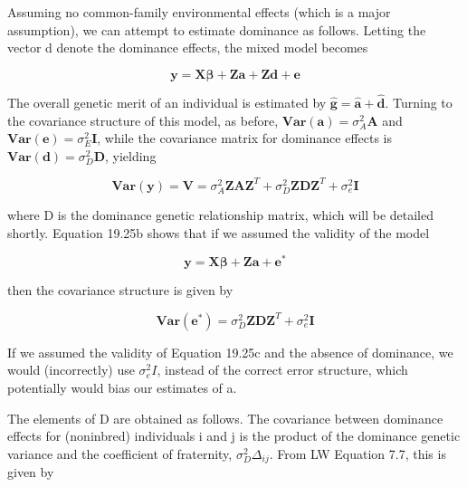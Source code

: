 \documentclass{article}
\begin{document}
Assuming no common-family environmental effects (which is a major assumption), we can attempt to estimate dominance as follows. Letting the vector d denote the dominance effects, the mixed model becomes

\begin{equation}
\mathbf{y}=\mathbf{X}\boldsymbol{\beta}+\mathbf{Z}\mathbf{a}+\mathbf{Z}\mathbf{d}+\mathbf{e}
\tag{19.25a}
\label{eq:19_25a}
\end{equation}

The overall genetic merit of an individual is estimated by  $ \hat{\mathbf{g}} = \hat{\mathbf{a}} + \hat{\mathbf{d}} $. Turning to the covariance structure of this model, as before,  $ \mathbf{Var}(\mathbf{a}) = \sigma_A^2 \mathbf{A} $ and  $ \mathbf{Var}(\mathbf{e}) = \sigma_E^2 \mathbf{I} $, while the covariance matrix for dominance effects is  $ \mathbf{Var}(\mathbf{d}) = \sigma_D^2 \mathbf{D} $, yielding

\begin{equation}
\mathbf{V}\mathbf{a}\mathbf{r}(\mathbf{y})=\mathbf{V}=\sigma_{A}^{2}\mathbf{Z}\mathbf{A}\mathbf{Z}^{T}+\sigma_{D}^{2}\mathbf{Z}\mathbf{D}\mathbf{Z}^{T}+\sigma_{e}^{2}\mathbf{I}
\tag{19.25b}
\label{eq:19_25b}
\end{equation}

where D is the dominance genetic relationship matrix, which will be detailed shortly. Equation 19.25b shows that if we assumed the validity of the model

\begin{equation}
\mathbf{y}=\mathbf{X}\boldsymbol{\beta}+\mathbf{Z}\mathbf{a}+\mathbf{e}^{*}
\tag{19.25c}
\label{eq:19_25c}
\end{equation}

then the covariance structure is given by

\begin{equation}
\mathbf{V a r}(\mathbf{e}^{*})=\sigma_{D}^{2}\mathbf{Z D}\mathbf{Z}^{T}+\sigma_{e}^{2}\mathbf{I}
\tag{19.25d}
\label{eq:19_25d}
\end{equation}

If we assumed the validity of Equation 19.25c and the absence of dominance, we would (incorrectly) use  $ \sigma_e^2 I $, instead of the correct error structure, which potentially would bias our estimates of a.

The elements of D are obtained as follows. The covariance between dominance effects for (noninbred) individuals i and j is the product of the dominance genetic variance and the coefficient of fraternity,  $ \sigma_D^2 \Delta_{ij} $. From LW Equation 7.7, this is given by
\end{document}
